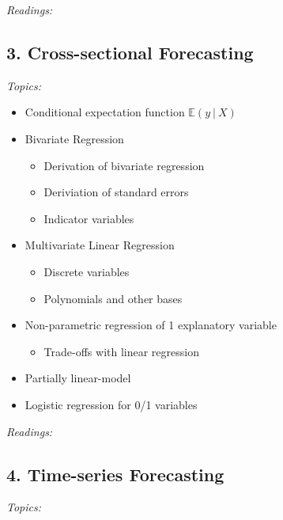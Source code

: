 \documentclass[12pt]{article}
\begin{document}
\bigskip
\noindent\emph{Readings:}


\subsection*{3. Cross-sectional Forecasting}

\noindent\emph{Topics:}

\begin{itemize}
  \item Conditional expectation function $\mathbb{E}(y \ \vert \ X)$
  \item Bivariate Regression 
  \begin{itemize}
    \item Derivation of bivariate regression
    \item Deriviation of standard errors 
    \item Indicator variables
  \end{itemize}

  \item Multivariate Linear Regression
  \begin{itemize}
    \item Discrete variables
    \item Polynomials and other bases
  \end{itemize}

  \item Non-parametric regression of 1 explanatory variable
  \begin{itemize}
    \item Trade-offs with linear regression
  \end{itemize}

  \item Partially linear-model
  
  \item Logistic regression for 0/1 variables
\end{itemize}

\bigskip
\noindent\emph{Readings:}


\subsection*{4. Time-series Forecasting}

\noindent\emph{Topics:}
\end{document}
